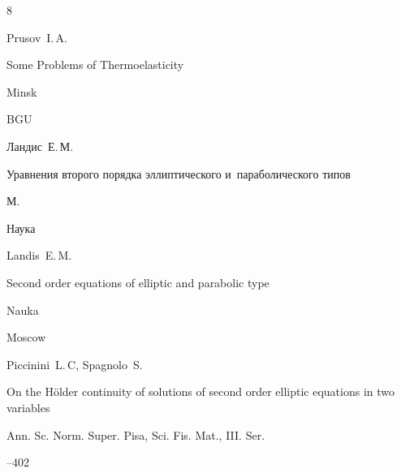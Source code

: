 \begin{thebibliography}{8}

\misctransl

\by Prusov~I.\,A.

\book Some Problems of Thermoelasticity 

\publaddr Minsk

\publ BGU






\by Ландис~Е.\,М.

\book Уравнения второго порядка эллиптического и~параболического типов

\publaddr М.

\publ Наука



\misctransl

\by Landis~E.\,M. 

\book Second order equations of elliptic and parabolic type

\publ Nauka

\publaddr Moscow






\by Piccinini~L.\,C, Spagnolo~S.

\paper On the H\"{o}lder continuity of solutions of second order elliptic equations in two variables

\jour Ann. Sc. Norm. Super. Pisa, Sci. Fis. Mat., III. Ser.




--402









\end{thebibliography}





\noindent

\hskip6.5cm \thedate \par\noindent

\hskip6.5cm\therevdate









